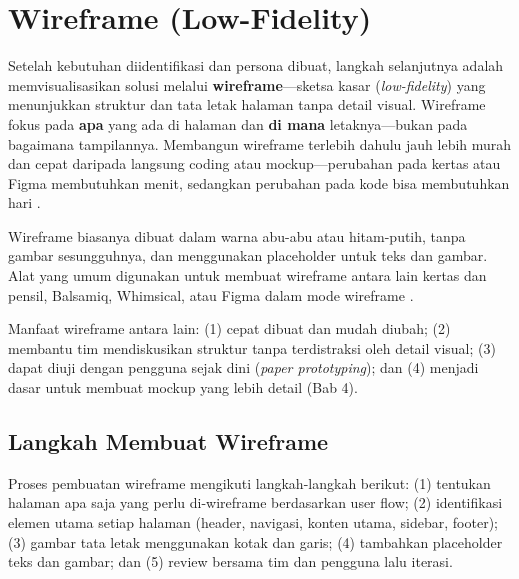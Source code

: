 \section{Wireframe (Low-Fidelity)}

Setelah kebutuhan diidentifikasi dan persona dibuat, langkah selanjutnya adalah memvisualisasikan solusi melalui \textbf{wireframe}---sketsa kasar (\textit{low-fidelity}) yang menunjukkan struktur dan tata letak halaman tanpa detail visual. Wireframe fokus pada \textbf{apa} yang ada di halaman dan \textbf{di mana} letaknya---bukan pada bagaimana tampilannya. Membangun wireframe terlebih dahulu jauh lebih murah dan cepat daripada langsung coding atau mockup---perubahan pada kertas atau Figma membutuhkan menit, sedangkan perubahan pada kode bisa membutuhkan hari \cite{mdnLearn}.

Wireframe biasanya dibuat dalam warna abu-abu atau hitam-putih, tanpa gambar sesungguhnya, dan menggunakan placeholder untuk teks dan gambar. Alat yang umum digunakan untuk membuat wireframe antara lain kertas dan pensil, Balsamiq, Whimsical, atau Figma dalam mode wireframe \cite{webdevLearn}.

Manfaat wireframe antara lain: (1) cepat dibuat dan mudah diubah; (2) membantu tim mendiskusikan struktur tanpa terdistraksi oleh detail visual; (3) dapat diuji dengan pengguna sejak dini (\textit{paper prototyping}); dan (4) menjadi dasar untuk membuat mockup yang lebih detail (Bab 4).

\subsection{Langkah Membuat Wireframe}

Proses pembuatan wireframe mengikuti langkah-langkah berikut: (1) tentukan halaman apa saja yang perlu di-wireframe berdasarkan user flow; (2) identifikasi elemen utama setiap halaman (header, navigasi, konten utama, sidebar, footer); (3) gambar tata letak menggunakan kotak dan garis; (4) tambahkan placeholder teks dan gambar; dan (5) review bersama tim dan pengguna lalu iterasi.

